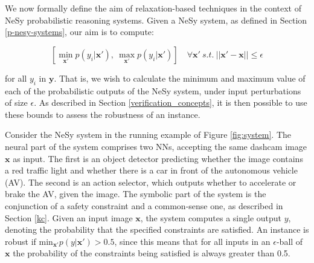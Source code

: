 



We now formally define the aim of relaxation-based techniques in the context of NeSy probabilistic reasoning systems. Given a NeSy system, as defined in Section \ref{p-nesy-systems}, our aim is to compute:

\vspace{-0.3cm}
\begin{equation}
\left[
\min\limits_{\boldsymbol{x'}} p(\mathit{y_i} | \boldsymbol{x'}), \  
\max\limits_{\boldsymbol{x'}} p(\mathit{y_i} | \boldsymbol{x'}) 
\right] \quad
\forall \boldsymbol{x'} \ s.t. \ ||\boldsymbol{x'} - \boldsymbol{x}|| \leq \epsilon
\label{eq:goal}
\end{equation}

\noindent for all $\mathit{y_i}$ in $\boldsymbol{y}$. That is, we wish to calculate the minimum and maximum value of each of the probabilistic outputs of the NeSy system, under input perturbations of size $\epsilon$. As described in Section \ref{verification_concepts}, it is then possible to use these bounds to assess the robustness of an instance.

Consider the NeSy system in the running example of Figure \ref{fig:system}. The neural part of the system comprises two NNs, accepting the same dashcam image $\boldsymbol{x}$ as input. The first is an object detector predicting whether the image contains a red traffic light and whether there is a car in front of the autonomous vehicle (AV). The second is an action selector, which outputs whether to accelerate or brake the AV, given the image. The symbolic part of the system is the conjunction of a safety constraint and a common-sense one, as described in Section \ref{kc}. Given an input image $\boldsymbol{x}$, the system computes a single output $\mathit{y}$, denoting the probability that the specified constraints are satisfied. An instance is robust if $\mathrm{min}_{\mathbf{x'}} p(\mathit{y} | \boldsymbol{x'}) > 0.5$, since this means that for all inputs in an $\epsilon$-ball of $\boldsymbol{x}$ the probability of the constraints being satisfied is always greater than 0.5.

